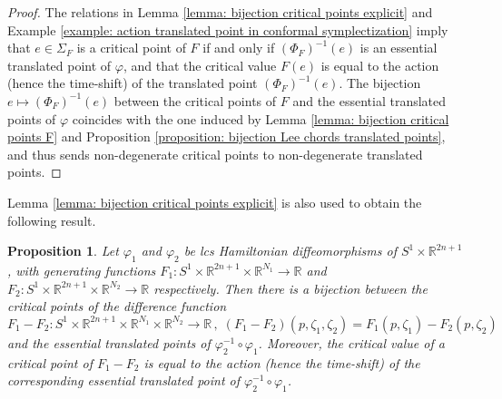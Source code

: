 \documentclass{amsart}
\newtheorem{prop}[thm]{Proposition}
\theoremstyle{remark}
\begin{document}
\begin{proof}
The relations in Lemma \ref{lemma: bijection critical points explicit}
and Example \ref{example: action translated point in conformal symplectization}
imply that $e \in \Sigma_F$ is a critical point of $F$
if and only if $(\Phi_F)^{-1} (e)$ is an essential translated point of $\varphi$,
and that the critical value $F(e)$
is equal to the action (hence the time-shift)
of the translated point $(\Phi_F)^{-1} (e)$.
The bijection $e \mapsto (\Phi_F)^{-1} (e)$
between the critical points of $F$
and the essential translated points of $\varphi$
coincides with the one induced by
Lemma \ref{lemma: bijection critical points F}
and Proposition \ref{proposition: bijection Lee chords translated points},
and thus sends non-degenerate critical points
to non-degenerate translated points.
\end{proof}

Lemma \ref{lemma: bijection critical points explicit}
is also used to obtain the following result.

\begin{prop}\label{proposition: difference function}
Let $\varphi_1$ and $\varphi_2$ be lcs Hamiltonian diffeomorphisms
of $S^1 \times \mathbb{R}^{2n+1}$,
with generating functions 
$F_1: S^1 \times \mathbb{R}^{2n+1} \times \mathbb{R}^{N_1} \rightarrow \mathbb{R}$
and $F_2: S^1 \times \mathbb{R}^{2n+1} \times \mathbb{R}^{N_2} \rightarrow \mathbb{R}$
respectively.
Then there is a bijection between
the critical points of the difference function
\[
F_1 - F_2:
S^1 \times \mathbb{R}^{2n+1} \times \mathbb{R}^{N_1} \times \mathbb{R}^{N_2}
\rightarrow \mathbb{R} \,,\;
(F_1 - F_2) (p, \zeta_1, \zeta_2)
= F_1 (p, \zeta_1) - F_2 (p, \zeta_2)
\]
and the essential translated points of $\varphi_2^{-1} \circ \varphi_1$.
Moreover,
the critical value of a critical point of $F_1 - F_2$
is equal to the action (hence the time-shift)
of the corresponding essential translated point
of $\varphi_2^{-1} \circ \varphi_1$.
\end{prop}
\end{document}

